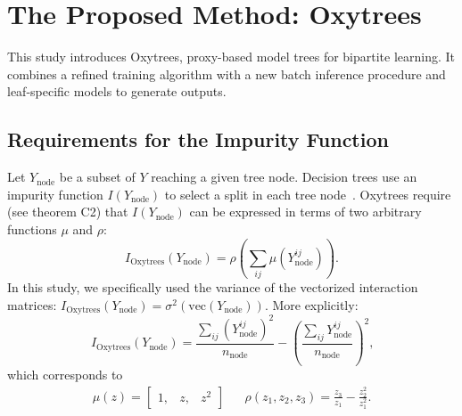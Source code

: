 \documentclass[letterpaper]{article}
\begin{document}
\section{The Proposed Method: Oxytrees}
\label{sec:oxytrees}

This study introduces Oxytrees, proxy-based model trees for bipartite learning. It combines a refined training algorithm with a new batch inference procedure and leaf-specific models to generate outputs.


\subsection{Requirements for the Impurity Function}
\label{sec:oxytrees impurity}

Let $Y_\text{node}$ be a subset of
$Y$ reaching a given tree node.
Decision trees use an impurity function $I(Y_\text{node})$ to select a split in each tree node~\cite{breiman_classification_1984,blockeel1998top}.
%
Oxytrees require (see theorem C2) that $I(Y_\text{node})$ can be expressed in terms of two arbitrary functions $\mu$ and $\rho$:
\begin{equation}
    \label{eq:i constraint}
    \textstyle
    I_\text{Oxytrees} (Y_\text{node}) = \rho(\sum_{ij}\mu(Y_\text{node}^{ij}))
    \text{.}
\end{equation}
%
In this study, we specifically used the variance of the vectorized interaction matrices: $I_\text{Oxytrees} (Y_\text{node}) = \sigma^2(\text{vec}(Y_\text{node}))$. More explicitly:
%
\begin{equation}
    \label{eq:i bgso}
    I_\text{Oxytrees} (Y_\text{node})
    = \frac{\sum_{ij}(Y^{ij}_\text{node})^2}{n_\text{node}} - \left(\frac{\sum_{ij}Y^{ij}_\text{node}}{n_\text{node}}\right)^2
    \text{,}
\end{equation}
which corresponds to
\begin{align}
    \mu(z) = \begin{bmatrix} 1, & z, & z^2 \end{bmatrix}
    &&
    \rho(z_1, z_2, z_3) = \frac{z_3}{z_1} - \frac{z_2^2}{z_1^2}
    \text{.}
\end{align}
\end{document}
